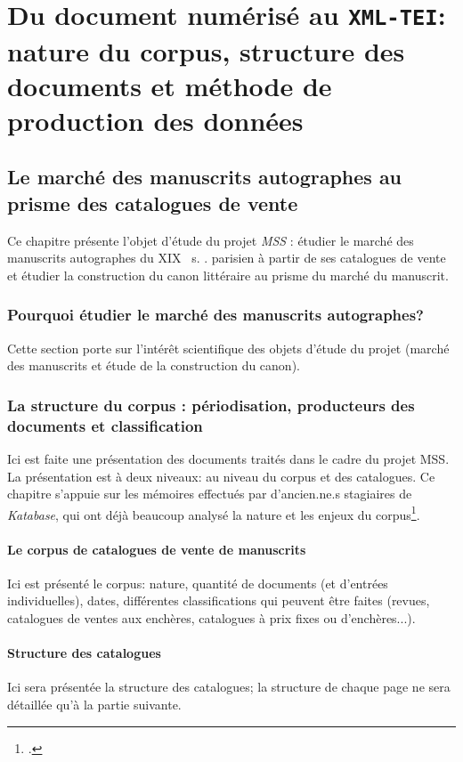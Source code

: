 \documentclass[a4paper, 12pt, twoside]{book}
\newcommand{\siecle}[1]{%
	#1%
	\ifthenelse{\equal{#1}{I}}{\up{er}}{\up{ème}}%
	~s.%
}
\newcommand{\ktb}{\textit{Katabase}}
\newcommand{\mss}{\textit{MSS}}
\newcommand{\xmltei}{\texttt{XML-TEI}}
\begin{document}
\part{Du document numérisé au \xmltei: nature du corpus, structure des documents et méthode de production des données}
\chapter{Le marché des manuscrits autographes au prisme des catalogues de vente}
Ce chapitre présente l'objet d'étude du projet \mss{} : étudier le marché des manuscrits autographes du \siecle{XIX}. parisien à partir de ses catalogues de vente et étudier la construction du canon littéraire au prisme du marché du manuscrit.

\section{Pourquoi étudier le marché des manuscrits autographes?}
Cette section porte sur l'intérêt scientifique des objets d'étude du projet (marché des manuscrits et étude de la construction du canon).


\section{La structure du corpus : périodisation, producteurs des documents et classification}
Ici est faite une présentation des documents traités dans le cadre du projet MSS. La présentation est à deux niveaux: au niveau du corpus et des catalogues. Ce chapitre s'appuie sur les mémoires effectués par d'ancien.ne.s stagiaires de \ktb{}, qui ont déjà beaucoup analysé la nature et les enjeux du corpus\footcite{rondeau_du_noyer_encoder_2019, corbieres_du_2020, janes_du_2021}.

\subsection{Le corpus de catalogues de vente de manuscrits}
Ici est présenté le corpus: nature, quantité de documents (et d'entrées individuelles), dates, différentes classifications qui peuvent être faites (revues, catalogues de ventes aux enchères, catalogues à prix fixes ou d'enchères...).

\subsection{Structure des catalogues}
Ici sera présentée la structure des catalogues; la structure de chaque page ne sera détaillée qu'à la partie suivante.
\end{document}
